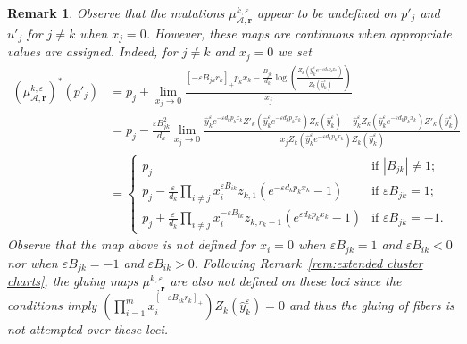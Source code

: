 \documentclass{amsart}
\newtheorem{remark}[theorem]{Remark}
\numberwithin{equation}{section}
\newcommand{\bfr}{{\boldsymbol{r}}}
\newcommand{\cA}{\mathcal{A}}
\begin{document}
\begin{remark}
  \label{rem:boundaries}
  Observe that the mutations $\mu_{\cA,\bfr}^{k,\varepsilon}$ appear to be undefined on $p'_j$ and $u'_j$ for $j\ne k$ when $x_j=0$.
  However, these maps are continuous when appropriate values are assigned.
  Indeed, for $j\ne k$ and $x_j=0$ we set
  \begin{align*}
    (\mu_{\cA,\bfr}^{k,\varepsilon})^*(p'_j)
    &=p_j+\lim_{x_j \to 0}\frac{[-\varepsilon B_{jk} r_k]_+ p_k x_k - \frac{B_{jk}}{d_k}\log\left(\frac{Z_k(\hat y_k^\varepsilon e^{-\varepsilon d_kp_kx_k})}{Z_k(\hat y_k^\varepsilon)}\right)}{x_j}\\
    &=p_j-\frac{\varepsilon B_{jk}^2}{d_k} \lim_{x_j\to 0} \frac{ \hat y_k^\varepsilon e^{-\varepsilon d_kp_kx_k} Z'_k(\hat y_k^\varepsilon e^{-\varepsilon d_kp_kx_k}) Z_k(\hat y_k^\varepsilon) - \hat y_k^\varepsilon Z_k(\hat y_k^\varepsilon e^{-\varepsilon d_kp_kx_k}) Z'_k(\hat y_k^\varepsilon) }{ x_j Z_k(\hat y_k^\varepsilon e^{-\varepsilon d_kp_kx_k}) Z_k(\hat y_k^\varepsilon) }\\
    &=\begin{cases} 
      p_j & \text{if $|B_{jk}| \ne 1$;}\\ 
      p_j - \frac{\varepsilon}{d_k} \prod_{i\ne j} x_i^{\varepsilon B_{ik}} z_{k,1} (e^{-\varepsilon d_kp_kx_k} - 1) & \text{if $\varepsilon B_{jk} = 1$;}\\ 
      p_j + \frac{\varepsilon}{d_k} \prod_{i\ne j} x_i^{-\varepsilon B_{ik}} z_{k,r_k-1} (e^{\varepsilon d_kp_kx_k} - 1) & \text{if $\varepsilon B_{jk} = -1$.}
    \end{cases}
  \end{align*}
  Observe that the map above is not defined for $x_i=0$ when $\varepsilon B_{jk}=1$ and $\varepsilon B_{ik} < 0$ nor when $\varepsilon B_{jk} = -1$ and $\varepsilon B_{ik} > 0$.
  Following Remark~\ref{rem:extended cluster charts}, the gluing maps $\mu_{-,\bfr}^{k,\varepsilon}$ are also not defined on these loci since the conditions imply $\left(\prod\limits_{i=1}^m x_i^{[-\varepsilon B_{ik}r_k]_+}\right)Z_k(\hat y_k^\varepsilon)=0$ and thus the gluing of fibers is not attempted over these loci. 
\end{remark}
\end{document}
